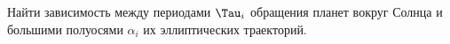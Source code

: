Найти зависимость между периодами $\Tau_i$ обращения планет вокруг Солнца и большими полуосями $\alpha_i$ их эллиптических
траекторий.
